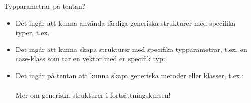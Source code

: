 \begin{Slide}{Typparametrar på tentan?}
\begin{itemize}
\item Det ingår att kunna använda färdiga generiska strukturer med specifika typer, t.ex. 

\item Det ingår att kunna skapa strukturer med specifika typparametrar, t.ex. en case-klass som tar en vektor med en specifik typ:\\



\item Det ingår  på tentan att kunna skapa generiska metoder eller klasser, t.ex.: \\
 \\
Mer om generiska strukturer i fortsättningskursen!
\end{itemize}
\end{Slide}

\fi






